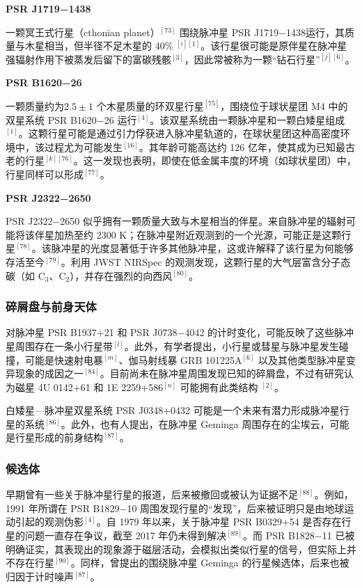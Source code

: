 \textbf{PSR J1719−1438}

一颗冥王式行星（cthonian planet）$^{[73]}$ 围绕脉冲星 PSR J1719−1438运行，其质量与木星相当，但半径不足木星的 40\% $^{[i][1]}$。该行星很可能是原伴星在脉冲星强辐射作用下被蒸发后留下的富碳残骸$^{[3]}$，因此常被称为一颗“钻石行星”$^{[j][6]}$。

\textbf{PSR B1620−26}

一颗质量约为$2.5\pm1$ 个木星质量的环双星行星$^{[75]}$，围绕位于球状星团 M4 中的双星系统 PSR B1620−26 运行$^{[4]}$。该双星系统由一颗脉冲星和一颗白矮星组成$^{[1]}$。这颗行星可能是通过引力俘获进入脉冲星轨道的，在球状星团这种高密度环境中，该过程尤为可能发生$^{[16]}$。其年龄可能高达约 126 亿年，使其成为已知最古老的行星$^{[k][76]}$。这一发现也表明，即使在低金属丰度的环境（如球状星团）中，行星同样可以形成$^{[77]}$。

\textbf{PSR J2322−2650}

PSR J2322−2650 似乎拥有一颗质量大致与木星相当的伴星。来自脉冲星的辐射可能将该伴星加热至约 2300 K；在脉冲星附近观测到的一个光源，可能正是这颗行星$^{[78]}$。该脉冲星的光度显著低于许多其他脉冲星，这或许解释了该行星为何能够存活至今$^{[79]}$。利用 JWST NIRSpec 的观测发现，这颗行星的大气层富含分子态碳（如 C$_3$、C$_2$），并存在强烈的向西风$^{[80]}$。
\subsubsection{碎屑盘与前身天体}
对脉冲星 PSR B1937+21 和 PSR J0738−4042 的计时变化，可能反映了这些脉冲星周围存在一条小行星带$^{[l]}$。此外，有学者提出，小行星或彗星与脉冲星发生碰撞，可能是快速射电暴$^{[m]}$、伽马射线暴 GRB 101225A$^{[6]}$ 以及其他类型脉冲星变异现象的成因之一$^{[84]}$。目前尚未在脉冲星周围发现已知的碎屑盘，不过有研究认为磁星 4U 0142+61 和 1E 2259+586$^{[n]}$ 可能拥有此类结构 $^{[2]}$。

白矮星—脉冲星双星系统 PSR J0348+0432 可能是一个未来有潜力形成脉冲星行星的系统$^{[86]}$。此外，也有人提出，在脉冲星 Geminga 周围存在的尘埃云，可能是行星形成的前身结构$^{[87]}$。
\subsubsection{候选体}
早期曾有一些关于脉冲星行星的报道，后来被撤回或被认为证据不足$^{[88]}$。例如，1991 年所谓在 PSR B1829−10 周围发现行星的“发现”，后来被证明只是由地球运动引起的观测伪影$^{[4]}$。自 1979 年以来，关于脉冲星 PSR B0329+54 是否存在行星的问题一直存在争议，截至 2017 年仍未得到解决$^{[89]}$。而 PSR B1828−11 已被明确证实，其表现出的现象源于磁层活动，会模拟出类似行星的信号，但实际上并不存在行星$^{[90]}$。同样，曾提出的围绕脉冲星 Geminga 的行星候选体，后来也被归因于计时噪声$^{[87]}$。
